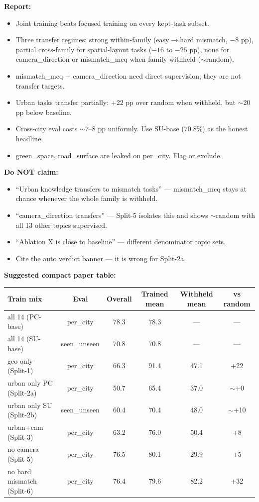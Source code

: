 \documentclass[11pt]{article}
\begin{document}
\textbf{Report:}
\begin{itemize}\itemsep1pt
\item Joint training beats focused training on every kept-task subset.
\item Three transfer regimes: strong within-family (easy$\to$hard mismatch, $-8$ pp), partial cross-family for spatial-layout tasks ($-16$ to $-25$ pp), none for camera\_direction or mismatch\_mcq when family withheld ($\sim$random).
\item mismatch\_mcq + camera\_direction need direct supervision; they are not transfer targets.
\item Urban tasks transfer partially: +22 pp over random when withheld, but $\sim$20 pp below baseline.
\item Cross-city eval costs $\sim$7--8 pp uniformly. Use SU-base (70.8\%) as the honest headline.
\item green\_space, road\_surface are leaked on per\_city. Flag or exclude.
\end{itemize}

\textbf{Do NOT claim:}
\begin{itemize}\itemsep1pt
\item ``Urban knowledge transfers to mismatch tasks'' --- mismatch\_mcq stays at chance whenever the whole family is withheld.
\item ``camera\_direction transfers'' --- Split-5 isolates this and shows $\sim$random with all 13 other topics supervised.
\item ``Ablation X is close to baseline'' --- different denominator topic sets.
\item Cite the auto verdict banner --- it is wrong for Split-2a.
\end{itemize}

\textbf{Suggested compact paper table:}

\begin{table}[h]\centering\small
\setlength{\tabcolsep}{4pt}
\begin{tabular}{l c c c c c}
\toprule
\textbf{Train mix} & \textbf{Eval} & \textbf{Overall} & \textbf{Trained mean} & \textbf{Withheld mean} & \textbf{vs random} \\
\midrule
all 14 (PC-base)                  & per\_city    & 78.3 & 78.3 & ---  & --- \\
all 14 (SU-base)                  & seen\_unseen & 70.8 & 70.8 & ---  & --- \\
geo only (Split-1)                & per\_city    & 66.3 & 91.4 & 47.1 & +22 \\
urban only PC (Split-2a)          & per\_city    & 50.7 & 65.4 & 37.0 & $\sim$+0 \\
urban only SU (Split-2b)          & seen\_unseen & 60.4 & 70.4 & 48.0 & $\sim$+10 \\
urban+cam (Split-3)               & per\_city    & 63.2 & 76.0 & 50.4 & +8 \\
no camera (Split-5)               & per\_city    & 76.5 & 80.1 & 29.9 & +5 \\
no hard mismatch (Split-6)        & per\_city    & 76.4 & 79.6 & 82.2 & +32 \\
\bottomrule
\end{tabular}
\end{table}
\end{document}
